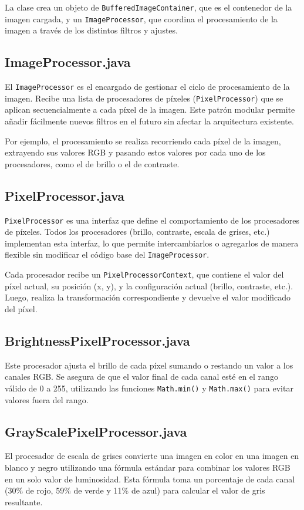 \documentclass{report}
\begin{document}
  La clase crea un objeto de \texttt{BufferedImageContainer}, que es el contenedor de la imagen cargada, y un \texttt{ImageProcessor}, que coordina el procesamiento de la imagen a través de los distintos filtros y ajustes.

  \subsection{ImageProcessor.java}\label{subsec:imageprocessor.java}
  El \texttt{ImageProcessor} es el encargado de gestionar el ciclo de procesamiento de la imagen.
  Recibe una lista de procesadores de píxeles (\texttt{PixelProcessor}) que se aplican secuencialmente a cada píxel de la imagen.
  Este patrón modular permite añadir fácilmente nuevos filtros en el futuro sin afectar la arquitectura existente.

  Por ejemplo, el procesamiento se realiza recorriendo cada píxel de la imagen, extrayendo sus valores RGB y pasando estos valores por cada uno de los procesadores, como el de brillo o el de contraste.

  \subsection{PixelProcessor.java}\label{subsec:pixelprocessor.java}
  \texttt{PixelProcessor} es una interfaz que define el comportamiento de los procesadores de píxeles.
  Todos los procesadores (brillo, contraste, escala de grises, etc.) implementan esta interfaz, lo que permite intercambiarlos o agregarlos de manera flexible sin modificar el código base del \texttt{ImageProcessor}.

  Cada procesador recibe un \texttt{PixelProcessorContext}, que contiene el valor del píxel actual, su posición (x, y), y la configuración actual (brillo, contraste, etc.). Luego, realiza la transformación correspondiente y devuelve el valor modificado del píxel.

  \subsection{BrightnessPixelProcessor.java}\label{subsec:brightnesspixelprocessor.java}
  Este procesador ajusta el brillo de cada píxel sumando o restando un valor a los canales RGB. Se asegura de que el valor final de cada canal esté en el rango válido de 0 a 255, utilizando las funciones \texttt{Math.min()} y \texttt{Math.max()} para evitar valores fuera del rango.

  \subsection{GrayScalePixelProcessor.java}\label{subsec:grayscalepixelprocessor.java}
  El procesador de escala de grises convierte una imagen en color en una imagen en blanco y negro utilizando una fórmula estándar para combinar los valores RGB en un solo valor de luminosidad.
  Esta fórmula toma un porcentaje de cada canal (30\% de rojo, 59\% de verde y 11\% de azul) para calcular el valor de gris resultante.
\end{document}
